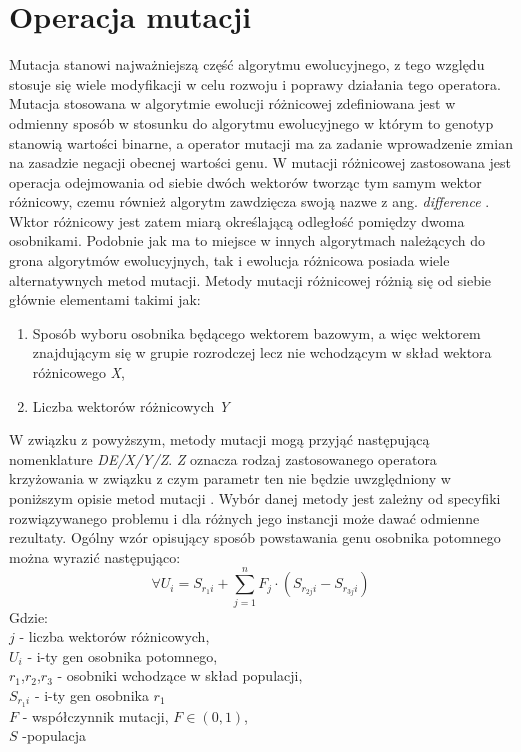 \chapter{Operacja mutacji}\label{cha:pierwszyDokument}

Mutacja stanowi najważniejszą część algorytmu ewolucyjnego, z tego względu stosuje się wiele modyfikacji w celu rozwoju i poprawy działania tego operatora.
Mutacja stosowana w algorytmie ewolucji różnicowej zdefiniowana jest w odmienny sposób w stosunku do algorytmu ewolucyjnego w którym to genotyp stanowią wartości binarne, a operator mutacji ma za zadanie wprowadzenie zmian na zasadzie negacji obecnej wartości genu. W mutacji różnicowej zastosowana jest operacja odejmowania od siebie dwóch wektorów tworząc tym samym wektor różnicowy, czemu również algorytm zawdzięcza swoją nazwe z ang. \textsl{difference} \cite{przystojny_koles}. Wktor różnicowy jest zatem miarą określającą odległość pomiędzy dwoma osobnikami.  Podobnie jak ma to miejsce w innych algorytmach należących do grona algorytmów ewolucyjnych, tak i ewolucja różnicowa posiada wiele alternatywnych metod mutacji. Metody mutacji różnicowej różnią się od siebie głównie elementami takimi jak:

\begin{enumerate}
\item Sposób  wyboru osobnika będącego wektorem bazowym, a więc wektorem znajdującym się w grupie rozrodczej lecz nie wchodzącym w skład wektora różnicowego \textsl{X},
\item Liczba wektorów różnicowych \textsl{Y}
\end{enumerate}
\par
W związku z powyższym, metody mutacji mogą przyjąć następującą nomenklature \textsl{DE/X/Y/Z}. \textsl{Z} oznacza rodzaj zastosowanego operatora krzyżowania w związku z czym parametr ten nie będzie uwzględniony w poniższym opisie metod mutacji . Wybór danej metody jest zależny od specyfiki rozwiązywanego problemu i dla różnych jego instancji może dawać odmienne rezultaty. Ogólny wzór opisujący sposób powstawania genu osobnika potomnego można wyrazić następująco:
$$
 \forall U_{i} =S_{r_{1}i} + \sum_{j=1}^{n} F_{j} \cdot (S_{r_{2j}i} - S_{r_{3j}i})
$$
Gdzie:\\
$j$ - liczba wektorów różnicowych,\\
$U_{i}$ - i-ty gen osobnika potomnego,\\
$r_{1}$,$ r_{2}$,$ r_{3}$ - osobniki wchodzące w skład populacji,\\
$S_{r_{1}i}$ - i-ty gen osobnika $r_{1}$\\
$F$ - współczynnik mutacji, $F \in (0,1)$,\\
$S$ -populacja\\


